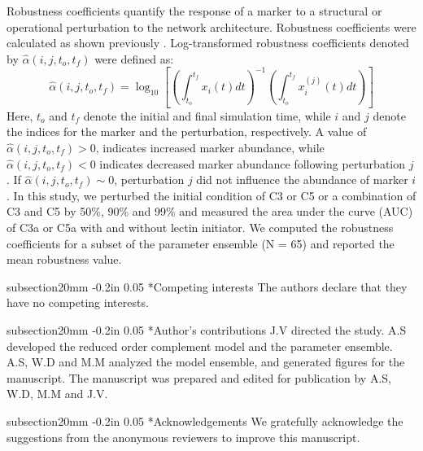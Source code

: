 \documentclass[12pt]{article}
\makeatletter
\renewcommand\section{\@startsection
	{subsection}{2}{0mm}
	{-0.2in}
	{0.05\baselineskip}
	{\normalfont\large\bfseries}}
\makeatother
\begin{document}
Robustness coefficients quantify the response of a marker to a structural or operational perturbation to the network architecture.
Robustness coefficients were calculated as shown previously \cite{Tasseff:2011aa}.
Log-transformed robustness coefficients denoted by $\hat{\alpha}\left(i,j,t_{o},t_{f}\right)$ were defined as:
\begin{equation}
\hat{\alpha}\left(i,j,t_{o},t_{f}\right)=\log_{10}\left[\left(\displaystyle\int_{t_{o}}^{t_{f}}x_{i}\left(t\right)dt\right)^{-1}\left(\displaystyle\int_{t_{o}}^{t_{f}}x^{(j)}_{i}\left(t\right)dt\right)\right]
\end{equation}
Here, $t_o$ and $t_f$ denote the initial and final simulation time, while $i$ and $j$ denote the indices for the marker and the perturbation, respectively.
A value of $\hat{\alpha}\left(i,j,t_{o},t_{f}\right)>0$, indicates increased marker abundance, while $\hat{\alpha}\left(i,j,t_{o},t_{f}\right)<0$ indicates decreased marker abundance following perturbation $j$.
If $\hat{\alpha}\left(i,j,t_{o},t_{f}\right)\sim{0}$, perturbation $j$ did not influence the abundance of marker $i$.
In this study, we perturbed the initial condition of C3 or C5 or a combination of C3 and C5 by 50\%, 90\% and 99\% and measured the area under the curve (AUC)
of C3a or C5a with and without lectin initiator. We computed the robustness coefficients for a subset of the parameter ensemble (N = 65) and reported the mean robustness value.


\clearpage

\section*{Competing interests}
The authors declare that they have no competing interests.

\section*{Author's contributions}
J.V directed the study. A.S developed the reduced order complement model and the parameter ensemble.
A.S, W.D and M.M analyzed the model ensemble, and generated figures for the manuscript.
The manuscript was prepared and edited for publication by A.S, W.D, M.M and J.V.

\section*{Acknowledgements}
We gratefully acknowledge the suggestions from the anonymous reviewers to improve this manuscript.
\end{document}
